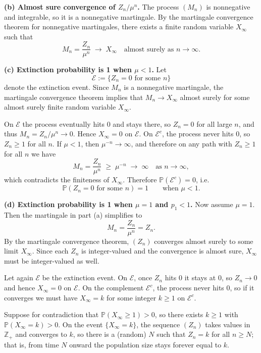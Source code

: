\documentclass[answers,12pt,addpoints]{exam}
\begin{document}
\begin{questions}
\begin{solution}
\medskip

\textbf{(b) Almost sure convergence of $Z_n/\mu^n$.}
The process $(M_n)$ is nonnegative and integrable, so it is a nonnegative martingale.
By the martingale convergence theorem for nonnegative martingales, there exists
a finite random variable $X_\infty$ such that
\[
M_n = \frac{Z_n}{\mu^n} \;\longrightarrow\; X_\infty
\quad \text{almost surely as } n\to\infty.
\]

\medskip

\textbf{(c) Extinction probability is 1 when $\mu<1$.}
Let
\[
\mathcal{E} := \{ Z_n = 0 \text{ for some } n\}
\]
denote the extinction event. Since $M_n$ is a nonnegative martingale, the martingale convergence theorem implies that $M_n \to X_\infty$ almost surely for some almost surely finite random variable $X_\infty$.

On $\mathcal{E}$ the process eventually hits $0$ and stays there, so $Z_n=0$ for all large
$n$, and thus $M_n = Z_n/\mu^n \to 0$. Hence $X_\infty = 0$ on $\mathcal{E}$.
On $\mathcal{E}^c$, the process never hits $0$, so $Z_n \ge 1$ for all $n$. If $\mu<1$,
then $\mu^{-n}\to\infty$, and therefore on any path with $Z_n \ge 1$ for all $n$ we have
\[
M_n = \frac{Z_n}{\mu^n} \;\ge\; \mu^{-n} \;\longrightarrow\; \infty \quad \text{as } n\to\infty,
\]
which contradicts the finiteness of $X_\infty$.
Therefore $\mathbb{P}(\mathcal{E}^c)=0$, i.e.
\[
\mathbb{P}(Z_n = 0 \text{ for some } n) = 1
\qquad\text{when }\mu < 1.
\]

\medskip

\textbf{(d) Extinction probability is 1 when $\mu=1$ and $p_1<1$.}
Now assume $\mu = 1$. Then the martingale in part (a) simplifies to
\[
M_n = \frac{Z_n}{\mu^n} = Z_n.
\]
By the martingale convergence theorem, $(Z_n)$ converges almost surely to some limit
$X_\infty$. Since each $Z_n$ is integer-valued and the convergence is almost sure,
$X_\infty$ must be integer-valued as well.

Let again $\mathcal{E}$ be the extinction event. On $\mathcal{E}$, once $Z_n$ hits $0$
it stays at $0$, so $Z_n\to 0$ and hence $X_\infty=0$ on $\mathcal{E}$. On the
complement $\mathcal{E}^c$, the process never hits $0$, so if it converges we must have
$X_\infty = k$ for some integer $k\ge 1$ on $\mathcal{E}^c$.

Suppose for contradiction that $\mathbb{P}(X_\infty \ge 1) > 0$, so there exists
$k\ge 1$ with $\mathbb{P}(X_\infty = k)>0$. On the event $\{X_\infty = k\}$, the sequence $(Z_n)$ takes values in $\mathbb{Z}_+$ and converges to $k$, so there is a (random) $N$ such that $Z_n = k$ for all $n\ge N$; that is, from time $N$ onward the population size stays forever equal to $k$.


\end{solution}
\end{questions}
\end{document}
